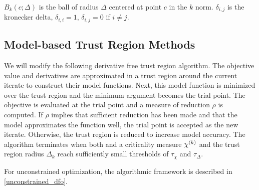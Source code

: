 $B_k(c; \Delta)$ is the ball of radius $\Delta$ centered at point $c$ in the $k$ norm.
$\delta_{i,j}$ is the kronecker delta, $\delta_{i,i} = 1$, $\delta_{i,j} = 0$ if $i\ne j$.


\subsection{Model-based Trust Region Methods}

We will modify the following derivative free trust region algorithm.
The objective value and derivatives are approximated in a trust region around the current iterate to construct their model functions.
Next, this model function is minimized over the trust region and the minimum argument becomes the trial point.
The objective is evaluated at the trial point and a measure of reduction $\rho$ is computed.
If $\rho$ implies that sufficient reduction has been made and that the model approximates the function well, the trial point is accepted as the new iterate.
Otherwise, the trust region is reduced to increase model accuracy.
The algorithm terminates when both and a criticality measure ${\chi^{(k)}}$ and the trust region radius $\Delta_k$ reach sufficiently small thresholds of $\tau_{\chi}$ and $\tau_{\Delta}$.


For unconstrained optimization, the algorithmic framework is described in \cref{unconstrained_dfo}.

